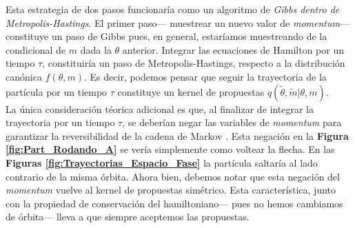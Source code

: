 Esta estrategia de dos pasos funcionaría como un algoritmo de \textit{Gibbs dentro de Metropolis-Hastings}. El primer paso--- muestrear un nuevo valor de \textit{momentum}--- constituye un paso de Gibbs pues, en general, estaríamos muestreando de la condicional de $m$ dada la $\theta$ anterior. Integrar las ecuaciones de Hamilton por un tiempo $\tau$, constituiría un paso de Metropolis-Hastings, respecto a la distribución canónica $f(\theta,m)$. Es decir, podemos pensar que seguir la trayectoria de la partícula por un tiempo $\tau$ constituye un kernel de propuestas $q(\tilde{\theta},\tilde{m}|\theta,m)$.\\ 

La única consideración téorica adicional es que, al finalizar de integrar la trayectoria por un tiempo $\tau$, se deberían negar las variables de \textit{momentum} para garantizar la reversibilidad de la cadena de Markov \parencite{Neal93,Neal11,Betancourt17}. Esta negación en la \textbf{Figura \ref{fig:Part_Rodando_A}} se vería simplemente como voltear la flecha. En las \textbf{Figuras \ref{fig:Trayectorias_Espacio_Fase}} la partícula saltaría al lado contrario de la misma órbita. Ahora bien, debemos notar que esta negación del \textit{momentum} vuelve al kernel de propuestas simétrico. Esta característica, junto con la propiedad de conservación del hamiltoniano--- pues no hemos cambiamos de órbita--- lleva a que siempre aceptemos las propuestas.\\ 

